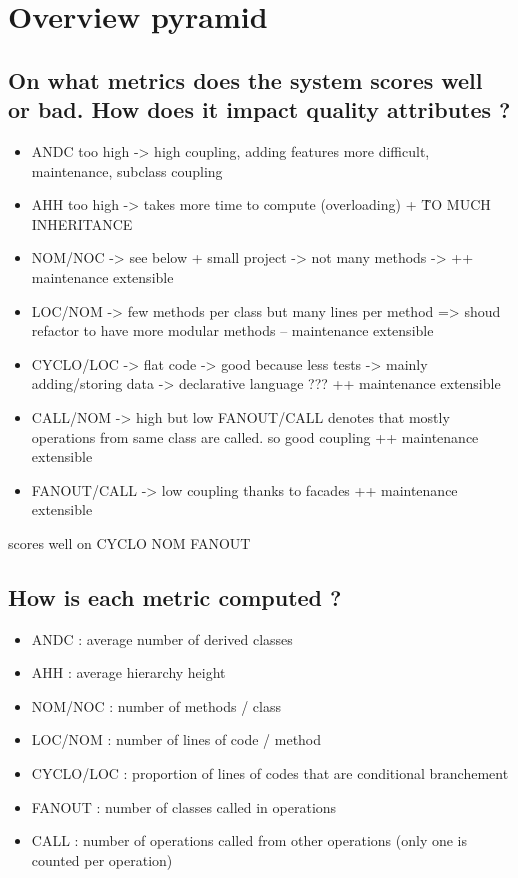 \section{Overview pyramid}

\subsection{On what metrics does the system scores well or bad. How does it impact quality attributes ?}

\begin{itemize}
    \item ANDC too high -> high coupling, adding features more difficult, maintenance, subclass coupling
    \item AHH too high -> takes more time to compute (overloading) + \^ TO MUCH INHERITANCE
    \item NOM/NOC -> see below + small project -> not many methods -> ++ maintenance extensible
    \item LOC/NOM -> few methods per class but many lines per method => shoud refactor to have more modular methods -- maintenance extensible
    \item CYCLO/LOC -> flat code -> good because less tests -> mainly adding/storing data -> declarative language ??? ++ maintenance extensible
    \item CALL/NOM -> high but low FANOUT/CALL denotes that mostly operations from same class are called. so good coupling ++ maintenance extensible
    \item FANOUT/CALL -> low coupling thanks to facades ++ maintenance extensible
\end{itemize}

scores well on CYCLO NOM FANOUT

\subsection{How is each metric computed ?}

\begin{itemize}
    \item ANDC : average number of derived classes
    \item AHH : average hierarchy height
    \item NOM/NOC : number of methods / class
    \item LOC/NOM : number of lines of code / method
    \item CYCLO/LOC : proportion of lines of codes that are conditional branchement
    \item FANOUT : number of classes called in operations
    \item CALL : number of operations called from other operations (only one is counted per operation)
\end{itemize}

